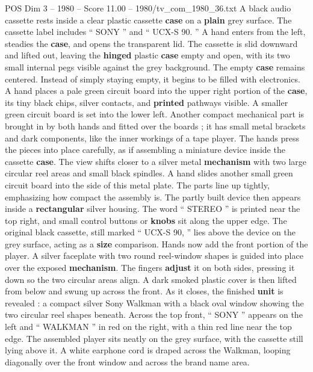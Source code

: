 \begin{textsample}{POS Dim 3 – 1980 – Score 11.00 – 1980/tv\_com\_1980\_36.txt}  \label{ex:f3_pos_042}
A black audio cassette rests inside a clear plastic cassette \textbf{case} on a \textbf{plain} grey surface.
The cassette label includes “ SONY ” and “ UCX-S 90. ” A hand enters from the left, steadies the \textbf{case}, and opens the transparent lid.
The cassette is slid downward and lifted out, leaving the \textbf{hinged} plastic \textbf{case} empty and open, with its two small internal pegs visible against the grey background.
The empty \textbf{case} remains centered.
Instead of simply staying empty, it begins to be filled with electronics.
A hand places a pale green circuit board into the upper right portion of the \textbf{case}, its tiny black chips, silver contacts, and \textbf{printed} pathways visible.
A smaller green circuit board is set into the lower left.
Another compact mechanical part is brought in by both hands and fitted over the boards ; it has small metal brackets and dark components, like the inner workings of a tape player.
The hands press the pieces into place carefully, as if assembling a miniature device inside the cassette \textbf{case}.
The view shifts closer to a silver metal \textbf{mechanism} with two large circular reel areas and small black spindles.
A hand slides another small green circuit board into the side of this metal plate.
The parts line up tightly, emphasizing how compact the assembly is.
The partly built device then appears inside a \textbf{rectangular} silver housing.
The word “ STEREO ” is printed near the top right, and small control buttons or \textbf{knobs} sit along the upper edge.
The original black cassette, still marked “ UCX-S 90, ” lies above the device on the grey surface, acting as a \textbf{size} comparison.
Hands now add the front portion of the player.
A silver faceplate with two round reel-window shapes is guided into place over the exposed \textbf{mechanism}.
The fingers \textbf{adjust} it on both sides, pressing it down so the two circular areas align.
A dark smoked plastic cover is then lifted from below and swung up across the front.
As it closes, the finished \textbf{unit} is revealed : a compact silver Sony Walkman with a black oval window showing the two circular reel shapes beneath.
Across the top front, “ SONY ” appears on the left and “ WALKMAN ” in red on the right, with a thin red line near the top edge.
The assembled player sits neatly on the grey surface, with the cassette still lying above it.
A white earphone cord is draped across the Walkman, looping diagonally over the front window and across the brand name area.

\end{textsample}
